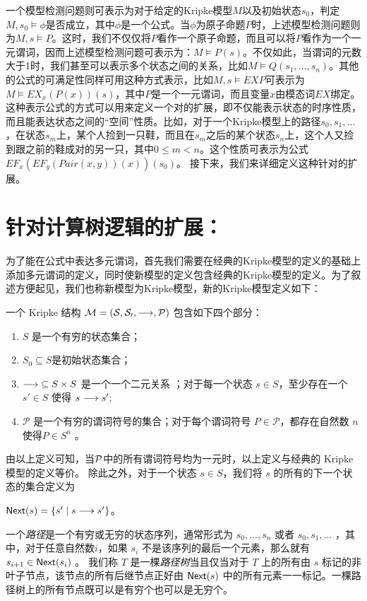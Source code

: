 一个\CTL{}模型检测问题则可表示为对于给定的Kripke模型$M$以及初始状态$s_0$，判定$M,s_0\models \phi$是否成立，其中$\phi$是一个\CTL{}公式。当$\phi$为原子命题$P$时，上述\CTL{}模型检测问题则为$M,s\models P$。这时，我们不仅仅将$P$看作一个原子命题，而且可以将$P$看作为一个一元谓词，因而上述模型检测问题可表示为：$M\models P(s)$。不仅如此，当谓词的元数大于1时，我们甚至可以表示多个状态之间的关系，比如$M\models Q(s_1,...,s_n)$。其他的\CTL{}公式的可满足性同样可用这种方式表示，比如$M,s\models EX P$可表示为$M\models EX_x(P(x))(s)$，其中$P$是一个一元谓词，而且变量$x$由模态词$EX$绑定。这种表示\CTL{}公式的方式可以用来定义一个对\CTL{}的扩展，即不仅能表示状态的时序性质，而且能表达状态之间的“空间”性质。比如，对于一个Kripke模型上的路径$s_0,s_1,...$，在状态$s_m$上，某个人捡到一只鞋，而且在$s_m$之后的某个状态$s_n$上，这个人又捡到跟之前的鞋成对的另一只，其中$0\le m<n$。这个性质可表示为公式$EF_x(EF_y(Pair(x,y))(x))(s_0)$。
接下来，我们来详细定义这种针对\CTL{}的扩展。

\section{针对计算树逻辑\CTL{}的扩展：\CTLP{}}\label{sec:ctlp}
为了能在公式中表达多元谓词，首先我们需要在经典的Kripke模型的定义的基础上添加多元谓词的定义，同时使新模型的定义包含经典的Kripke模型的定义。为了叙述方便起见，我们也称新模型为Kripke模型，新的Kripke模型定义如下：

\begin{definition}[本文中的Kripke 模型]
	一个 Kripke 结构 $\cal M = (S, S_0,\longrightarrow, \mathcal{P})$ 包含如下四个部分：
	\begin{enumerate}
		\item $S$ 是一个有穷的状态集合；
		\item $S_0\subseteq S$是初始状态集合；
		\item $\longrightarrow\;\subseteq S \times S$ 是一个一个二元关系 ；对于每一个状态 $s\in S$，至少存在一个 $s'\in S$ 使得 $s\longrightarrow s'$;
		\item $\mathcal{P}$ 是一个有穷的谓词符号的集合；对于每个谓词符号 $P\in \mathcal{P}$，都存在自然数 $n$ 使得$P\in S^n$ 。
	\end{enumerate}
\end{definition}
由以上定义可知，当$\cal P$中的所有谓词符号均为一元时，以上定义与经典的 Kripke 模型的定义等价。
除此之外，对于一个状态 $s\in S$，我们将 $s$ 的所有的下一个状态的集合定义为
\begin{center}
	$\textsf{Next}({s}) = \{s'\mid s\longrightarrow s'\}$。 
\end{center} 
一个\textit{路径}是一个有穷或无穷的状态序列，通常形式为 $s_0,...,s_n$ 或者 $s_0,s_1,...$ ，其中，对于任意自然数$i$，如果 $s_i$ 不是该序列的最后一个元素，那么就有 $s_{i+1}\in \textsf{Next}({s_i})$ 。
我们称 $T$ 是一棵\textit{路径树}当且仅当对于 $T$ 上的所有由 $s$ 标记的非叶子节点，该节点的所有后继节点正好由 $\textsf{Next}({s})$ 中的所有元素一一标记。一棵路径树上的所有节点既可以是有穷个也可以是无穷个。

